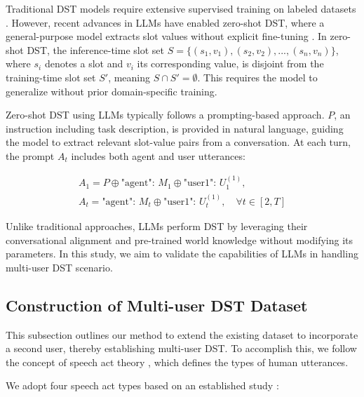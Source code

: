\documentclass[11pt]{article}
\begin{document}
Traditional DST models require extensive supervised training on labeled datasets \cite{heck2020trippy, campagna2020zero, li2021zero}. However, recent advances in LLMs have enabled zero-shot DST, where a general-purpose model extracts slot values without explicit fine-tuning \cite{feng2023towards, heck2023chatgpt}. In zero-shot DST, the inference-time slot set \( S = \{(s_1, v_1), (s_2, v_2), ..., (s_n, v_n)\} \), where \( s_i \) denotes a slot and \( v_i \) its corresponding value, is disjoint from the training-time slot set \( S' \), meaning \( S \cap S' = \emptyset \). This requires the model to generalize without prior domain-specific training.

Zero-shot DST using LLMs typically follows a prompting-based approach. $P$, an instruction including task description, is provided in natural language, guiding the model to extract relevant slot-value pairs from a conversation. At each turn, the prompt $A_t$ includes both agent and user utterances:

\begin{gather*}
A_1 = P \oplus \text{"agent": } M_1 \oplus \text{"user1": } U^{(1)}_1, \\
A_t = \text{"agent": } M_t \oplus \text{"user1": } U^{(1)}_t, \quad \forall t \in [2, T]
\end{gather*}




Unlike traditional approaches, LLMs perform DST by leveraging their conversational alignment and pre-trained world knowledge without modifying its parameters. In this study, we aim to validate the capabilities of LLMs in handling multi-user DST scenario.

\subsection{Construction of Multi-user DST Dataset}
\label{sec:method-generation}

This subsection outlines our method to extend the existing dataset to incorporate a second user, thereby establishing multi-user DST.  To accomplish this, we follow the concept of speech act theory \cite{austin1975things, bach1979linguistic}, which defines the types of human utterances.

We adopt four speech act types based on an established study \cite{bach1979linguistic}:
\end{document}
